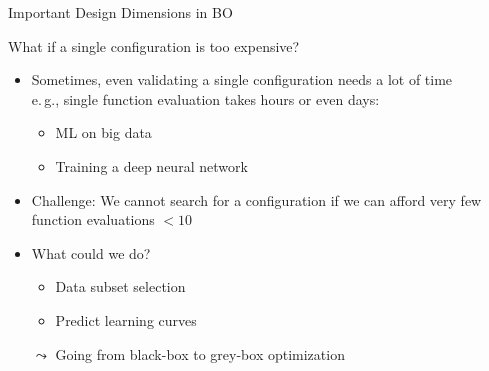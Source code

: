 {\begin{frame}[c,fragile]{Important Design Dimensions in BO}
\end{frame}
}
\begin{frame}[c,fragile]{What if a single configuration is too expensive?}


\begin{itemize}
  \item Sometimes, even validating a single configuration needs a lot of time\\
  		e.$\,$g., single function evaluation takes hours or even days:
  \begin{itemize}
    \item ML on big data
    \item Training a deep neural network  
  \end{itemize}
  \pause
  \item Challenge: We cannot search for a configuration if we can afford very few function evaluations $< 10$
  \pause
  \item \hands What could we do?
  \pause
  \begin{itemize}
    \item Data subset selection
    \item Predict learning curves
  \end{itemize}
  \item[$\leadsto$] Going from black-box to grey-box optimization
\end{itemize}

\end{frame}

